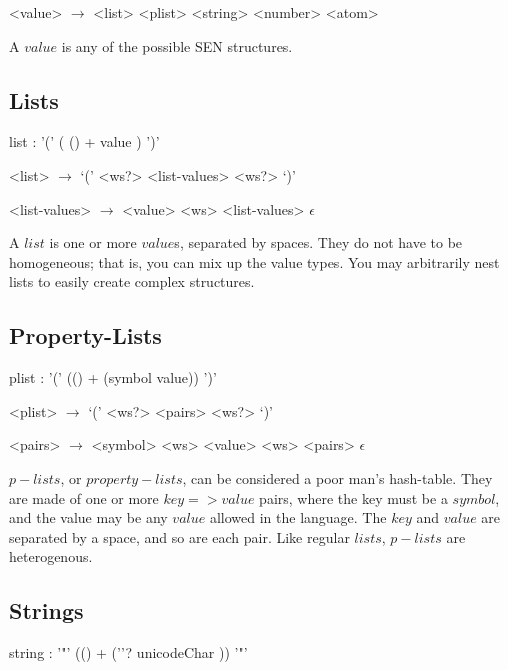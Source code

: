 \documentclass[a4paper]{article}
\begin{document}
\begin{grammar}
	<value> $\to$ <list>
		\alt <plist>
		\alt <string>
		\alt <number>
\end{grammar}

A $value$ is any of the possible SEN structures.

\subsection{Lists}
\begin{rail}
	list : '(' ( () + value ) ')'
\end{rail}

\begin{grammar}
	<list> $\to$ `(' <ws?> <list-values> <ws?> `)'

	<list-values> $\to$ <value> <ws> <list-values>
		\alt $\epsilon$
\end{grammar}

A $list$ is one or more $value$s, separated by spaces. They do not have to be homogeneous; that is, you can mix up the value types. You may arbitrarily nest lists to easily create complex structures.


\subsection{Property-Lists}
\begin{rail}
	plist : '(' (() + (symbol value)) ')'
\end{rail}

\begin{grammar}
	<plist> $\to$ `(' <ws?> <pairs> <ws?> `)'

	<pairs> $\to$ <symbol> <ws> <value> <ws> <pairs>
		\alt $\epsilon$
\end{grammar}

$p-lists$, or $property-lists$, can be considered a poor man's hash-table. They are made of one or more $key => value$ pairs, where the key must be a $symbol$, and the value may be any $value$ allowed in the language. The $key$ and $value$ are separated by a space, and so are each pair. Like regular $lists$, $p-lists$ are heterogenous.

\subsection{Strings}
\begin{rail}
	string : '"' (() + (''? unicodeChar )) '"'
\end{rail}
\end{document}
